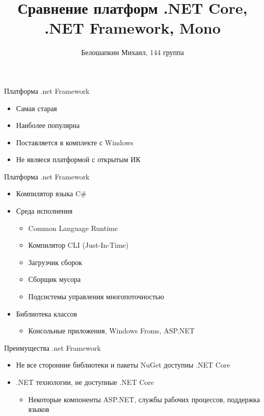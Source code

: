 \documentclass[14pt,pdf,hyperref={unicode}]{beamer}
\title{Сравнение платформ .NET Core, .NET Framework, Mono}
\author{Белошапкин Михаил, 144 группа}
\begin{document}
\maketitle

\begin{frame}{Платформа .net Framework}
    \begin{itemize}
        \item Самая старая
        \item Наиболее популярна
        \item Поставляется в комплекте с Windows
        \item Не являеся платформой с открытым ИК
    \end{itemize}
\end{frame}

\begin{frame}{Платформа .net Framework}
    \begin{itemize}{}
    \item Компилятор языка C\#
    \item Среда исполнения
    \begin{itemize}{}
        \item Common Language Runtime
        \item Компилятор CLI (Just-In-Time)
        \item Загрузчик сборок
        \item Сборщик мусора
        \item Подсистемы управления многопоточностью
    \end{itemize}
     \item Библиотека классов
        \begin{itemize}
            \item Консольные приложения, Windows Froms, ASP.NET
        \end{itemize}
\end{itemize}
\end{frame}

\begin{frame}{Преимущества .net Framework}
\begin{itemize}
    \item Не все сторонние библиотеки и пакеты NuGet доступны .NET Core
    \item .NET технологии, не доступные .NET Core
    \begin{itemize}
        \item Некоторые компоненты ASP.NET, службы рабочих процессов, поддержка языков
    \end{itemize}
\end{itemize}
    
\end{frame}
\end{document}
